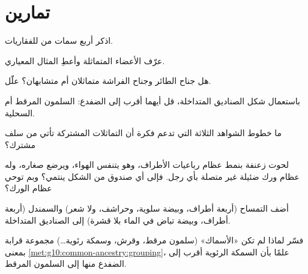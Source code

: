 \section{تمارين}

\begin{exercise}[$\star$]\label{exo:g10:common-ancestry:1}
اذكر أربع سمات من  للفقاريات.
\end{exercise}

\begin{exercise}[$\star$]\label{exo:g10:common-ancestry:2}
عرّف الأعضاء المتماثلة وأعطِ المثال المعياري.
\end{exercise}

\begin{exercise}[$\star$]\label{exo:g10:common-ancestry:3}
هل جناح الطائر وجناح الفراشة متماثلان أم متشابهان؟ علّل.
\end{exercise}

\begin{exercise}[$\star$]\label{exo:g10:common-ancestry:4}
باستعمال شكل الصناديق المتداخلة، قل أيهما أقرب إلى الضفدع: السلمون
المرقط أم السحلية.
\end{exercise}

\begin{exercise}[$\star$]\label{exo:g10:common-ancestry:5}
ما خطوط الشواهد الثلاثة التي تدعم فكرة أن التماثلات المشتركة تأتي من
سلف مشترك؟
\end{exercise}

\begin{exercise}[$\star\star$]\label{exo:g10:common-ancestry:6}
لحوت زعنفة بنمط عظام رباعيات الأطراف، وهو يتنفس الهواء، ويرضع صغاره،
وله عظام ورك ضئيلة غير متصلة بأي رجل. فإلى أي صندوق من الشكل ينتمي؟
وبم توحي عظام الورك؟
\end{exercise}

\begin{exercise}[$\star\star$]\label{exo:g10:common-ancestry:7}
أضف التمساح (أربعة أطراف، وبيضة سلوية، وحراشف، ولا شعر) والسمندل
(أربعة أطراف، وبيضة تباض في الماء بلا قشرة) إلى الصناديق المتداخلة.
\end{exercise}

\begin{exercise}[$\star\star$]\label{exo:g10:common-ancestry:8}
فسّر لماذا لم تكن «الأسماك» (سلمون مرقط، وقرش، وسمكة رئوية\dots)
مجموعة قرابة بمعنى \cref{met:g10:common-ancestry:grouping}، علمًا بأن
السمكة الرئوية أقرب إلى الضفدع منها إلى السلمون المرقط.
\end{exercise}

